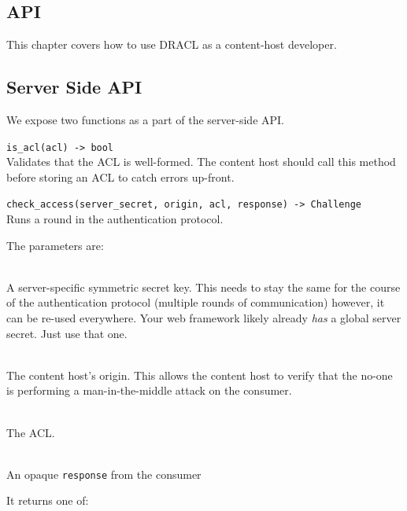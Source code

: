 \documentclass[pdftex,12pt,a4papaer,twoside,notitlepage]{report}
\begin{document}
\begin{appendices}

\chapter{API}
\label{chap:api}

This chapter covers how to use DRACL as a content-host developer.

\section{Server Side API}

We expose two functions as a part of the server-side API.

\begin{compactitem}[$\lambda$]
\item \verb=is_acl(acl) -> bool= \\
  Validates that the ACL is well-formed. The content host should call this
  method before storing an ACL to catch errors up-front.
\item \verb=check_access(server_secret, origin, acl, response) -> Challenge= \\
  Runs a round in the authentication protocol.

  The parameters are:

  \begin{description}[labelindent=2em,leftmargin=4em]
  \item[\texttt{server\_secret}] \hfill \\
    A server-specific symmetric secret key. This needs to stay the same for the
    course of the authentication protocol (multiple rounds of communication)
    however, it can be re-used everywhere. Your web framework likely already
    \emph{has} a global server secret. Just use that one.
  \item[\texttt{origin}] \hfill \\
    The content host's origin. This allows the content host to verify that the
    no-one is performing a man-in-the-middle attack on the consumer.
  \item[\texttt{acl}] \hfill \\
    The ACL.
  \item[\texttt{response}] \hfill \\
    An opaque \texttt{response} from the consumer
  \end{description}

  It returns one of:


\end{compactitem}
\end{appendices}
\end{document}
